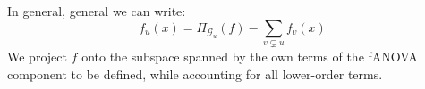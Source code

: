 In general, general we can write:
\begin{equation}
    f_u(x) = \Pi_{\mathcal{G}_u}(f) - \sum_{v \subsetneq u} f_v(x)
\end{equation}
We project $f$ onto the subspace spanned by the own terms of the fANOVA component to be defined, while accounting for all lower-order terms.













